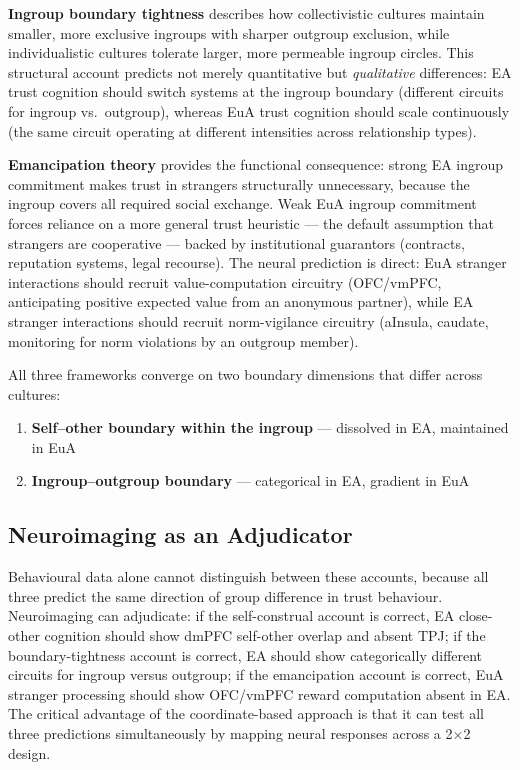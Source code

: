\documentclass[11pt,a4paper]{article}
\begin{document}
\textbf{Ingroup boundary tightness} \citep{Triandis1995} describes how collectivistic cultures
maintain smaller, more exclusive ingroups with sharper outgroup exclusion, while individualistic
cultures tolerate larger, more permeable ingroup circles. This structural account predicts not
merely quantitative but \emph{qualitative} differences: EA trust cognition should switch systems
at the ingroup boundary (different circuits for ingroup vs.\ outgroup), whereas EuA trust cognition
should scale continuously (the same circuit operating at different intensities across relationship
types).

\textbf{Emancipation theory} \citep{Yamagishi1994} provides the functional consequence: strong
EA ingroup commitment makes trust in strangers structurally unnecessary, because the ingroup
covers all required social exchange. Weak EuA ingroup commitment forces reliance on a more general
trust heuristic — the default assumption that strangers are cooperative — backed by institutional
guarantors (contracts, reputation systems, legal recourse). The neural prediction is direct:
EuA stranger interactions should recruit value-computation circuitry (OFC/vmPFC, anticipating
positive expected value from an anonymous partner), while EA stranger interactions should recruit
norm-vigilance circuitry (aInsula, caudate, monitoring for norm violations by an outgroup member).

All three frameworks converge on two boundary dimensions that differ across cultures:
\begin{enumerate}
  \item \textbf{Self--other boundary within the ingroup} — dissolved in EA, maintained in EuA
  \item \textbf{Ingroup--outgroup boundary} — categorical in EA, gradient in EuA
\end{enumerate}

\subsection{Neuroimaging as an Adjudicator}

Behavioural data alone cannot distinguish between these accounts, because all three predict
the same direction of group difference in trust behaviour. Neuroimaging can adjudicate: if the
self-construal account is correct, EA close-other cognition should show dmPFC self-other overlap
and absent TPJ; if the boundary-tightness account is correct, EA should show categorically
different circuits for ingroup versus outgroup; if the emancipation account is correct, EuA
stranger processing should show OFC/vmPFC reward computation absent in EA. The critical
advantage of the coordinate-based approach is that it can test all three predictions
simultaneously by mapping neural responses across a 2$\times$2 design.
\end{document}
